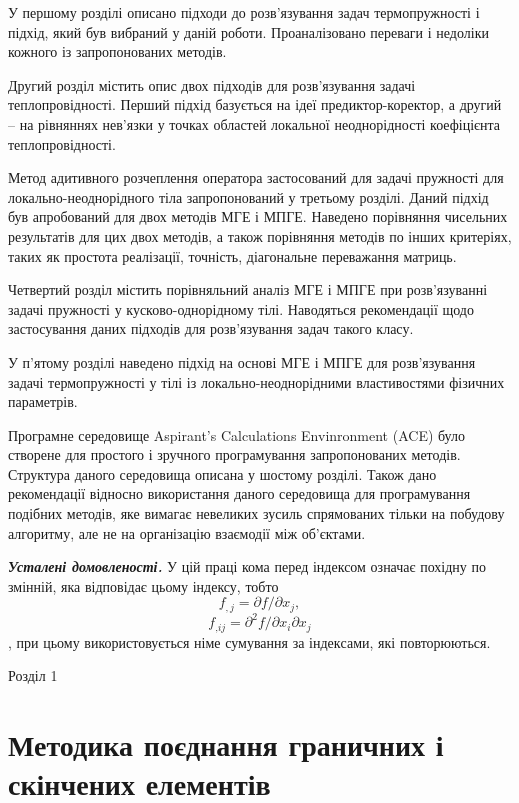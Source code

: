 У першому розділі описано підходи до розв'язування задач термопружності
і підхід, який був вибраний у даній роботи. Проаналізовано переваги і
недоліки кожного із запропонованих методів.

Другий розділ містить опис двох підходів для розв'язування задачі
теплопровідності. Перший підхід базується на ідеї предиктор-коректор, а
другий -- на рівняннях нев'язки у точках областей локальної
неоднорідності коефіцієнта теплопровідності.

Метод адитивного розчеплення оператора застосований для задачі пружності
для локально-неоднорідного тіла запропонований у третьому розділі. Даний
підхід був апробований для двох методів МГЕ і МПГЕ. Наведено порівняння
чисельних результатів для цих двох методів, а також порівняння методів
по інших критеріях, таких як простота реалізації, точність, діагональне
переважання матриць.

Четвертий розділ містить порівняльний аналіз МГЕ і МПГЕ при
розв'язуванні задачі пружності у кусково-однорідному тілі. Наводяться
рекомендації щодо застосування даних підходів для розв'язування задач
такого класу.

У п'ятому розділі наведено підхід на основі МГЕ і МПГЕ для розв'язування
задачі термопружності у тілі із локально-неоднорідними властивостями
фізичних параметрів.

Програмне середовище Aspirant's Calculations Envinronment (ACE) було
створене для простого і зручного програмування запропонованих методів.
Структура даного середовища описана у шостому розділі. Також дано
рекомендації відносно використання даного середовища для програмування
подібних методів, яке вимагає невеликих зусиль спрямованих тільки на
побудову алгоритму, але не на організацію взаємодії між об'єктами.

\emph{\textbf{Усталені домовленості. }}У цій праці кома перед індексом
означає похідну по змінній, яка відповідає цьому індексу, тобто
\textsubscript{ }\[{{f_{,j} = \partial}{f/\partial}x_{j},}{}\]
\[{{f_{,\mathit{\text{ij}}} = \partial^{2}}{f/\partial}x_{i}\partial x_{j}}{}\],
при цьому викори­стовується німе сумування за індек­сами, які
повторюються.

Розділ 1

\hypertarget{ux43cux435ux442ux43eux434ux438ux43aux430-ux43fux43eux454ux434ux43dux430ux43dux43dux44f-ux433ux440ux430ux43dux438ux447ux43dux438ux445-ux456-ux441ux43aux456ux43dux447ux435ux43dux438ux445-ux435ux43bux435ux43cux435ux43dux442ux456ux432}{%
\section[Методика поєднання граничних і скінчених елементів
]{\texorpdfstring{\protect\hypertarget{anchor-12}{}{}Методика поєднання
граничних і скінчених елементів
}{Методика поєднання граничних і скінчених елементів }}\label{ux43cux435ux442ux43eux434ux438ux43aux430-ux43fux43eux454ux434ux43dux430ux43dux43dux44f-ux433ux440ux430ux43dux438ux447ux43dux438ux445-ux456-ux441ux43aux456ux43dux447ux435ux43dux438ux445-ux435ux43bux435ux43cux435ux43dux442ux456ux432}}

